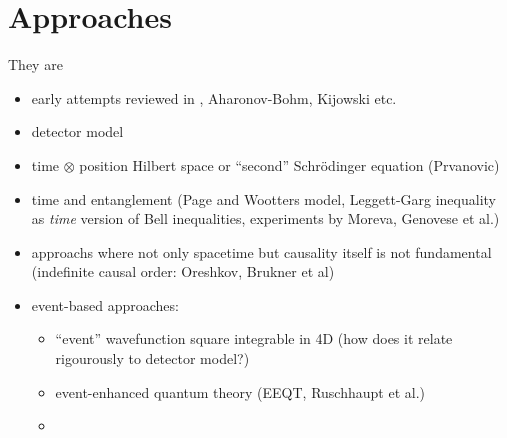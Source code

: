 \section{Approaches}

They are

\begin{itemize}
\item early attempts reviewed in \cite{TQM1, TQM2}, Aharonov-Bohm, Kijowski etc.
\item detector model \cite{TQM1, TQM2}
\item
    time $\otimes$ position Hilbert space or ``second'' Schr\"odinger equation (Prvanovic)
\item time and entanglement (Page and Wootters model, Leggett-Garg inequality as \emph{time} version of Bell inequalities, experiments by Moreva, Genovese et al.)
\item approachs where not only spacetime but causality itself is not fundamental (indefinite causal order: Oreshkov, Brukner et al)
\item event-based approaches: 
    \begin{itemize}
        \item ``event'' wavefunction square integrable in 4D (how does it relate rigourously to detector model?)
        \item event-enhanced quantum theory (EEQT, Ruschhaupt et al.)
        \item 
    \end{itemize}
\end{itemize}